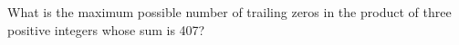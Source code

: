 What is the maximum possible number of trailing zeros in the product of three positive integers whose sum is 407?
